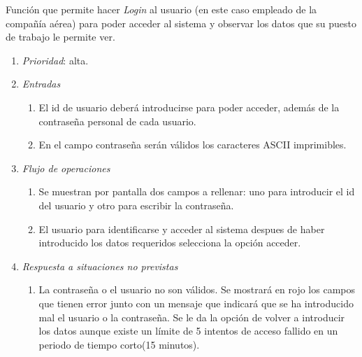 

	Función que permite hacer \textit{\gls{Login}} al usuario (en este caso empleado de la compañía aérea) para poder acceder al sistema y observar los datos que su puesto de trabajo le permite ver.
		
	\begin{enumerate}
		\item \textit{Prioridad}: alta.
		\item \textit{Entradas}
		\begin{enumerate}
			\item El id de usuario deberá introducirse para poder acceder, además de la contraseña personal de cada usuario.
			\item En el campo contraseña serán válidos los caracteres ASCII imprimibles.
		\end{enumerate}
		\item \textit{Flujo de operaciones}
		\begin{enumerate}
			\item Se muestran por pantalla dos campos a rellenar: uno para introducir el id del usuario y otro para escribir la contraseña.
			\item El usuario para identificarse y acceder al sistema despues de haber introducido los datos requeridos selecciona la opción acceder.
		\end{enumerate}
		\item \textit{Respuesta a situaciones no previstas}
		\begin{enumerate}
			\item La contraseña o el usuario no son válidos. Se mostrará en rojo los campos que tienen error junto con un mensaje que indicará que se ha introducido mal el usuario o la contraseña. Se le da la opción de volver a introducir los datos aunque existe un límite de 5 intentos de acceso fallido en un periodo de tiempo corto(15 minutos).
		\end{enumerate}
	
\end{enumerate}
								
